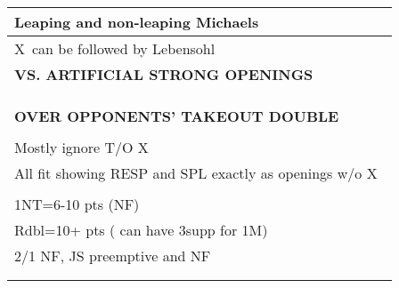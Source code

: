 \documentclass{article}
\newcommand\X{{\footnotesize X}}
\begin{document}
{\begin{minipage}{90mm}
\begin{tabular}{| p{88mm} |}
		\\ \hline
                Leaping and non-leaping Michaels
		\\ \hline
                \X\ can be followed by Lebensohl
		\\ \hline
		\textbf{VS. ARTIFICIAL STRONG OPENINGS} \\ \hline
		\\ \hline
		\\ \hline
		\\ \hline
		\textbf{OVER OPPONENTS' TAKEOUT DOUBLE} \\ \hline
		\\ \hline
                Mostly ignore T/O \X\
		\\ \hline
                All fit showing RESP and SPL
                exactly as openings w/o \X\
		\\ \hline
		\\ \hline
                1NT=6-10 pts (NF)
		\\ \hline
                Rdbl=10+ pts ( can have 3supp for 1M)
		\\ \hline
                2/1 NF, JS preemptive and  NF
		\\ \hline
		\\ \hline
		\\ \hline
	\end{tabular}
\end{minipage}
}
\begin{minipage}{5mm}
	\begin{tabular}{| p{5mm} |}
	\end{tabular}
\end{minipage}
\end{document}
